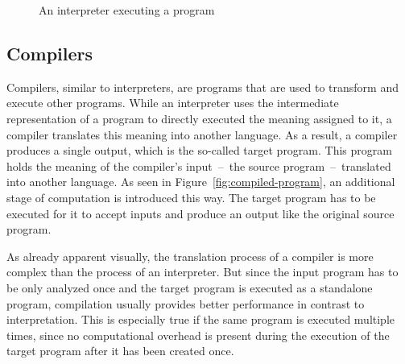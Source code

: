 \begin{figure}[h]
  \centering
  \caption{An interpreter executing a program}\label{fig:interpreted-program}
\end{figure}


\subsection{Compilers}

Compilers, similar to interpreters, are programs that are used to transform and execute other programs.
While an interpreter uses the intermediate representation of a program to directly executed the meaning assigned to it, a compiler translates this meaning into another language.
As a result, a compiler produces a single output, which is the so-called target program.
This program holds the meaning of the compiler's input~--~the source program~--~translated into another language.
As seen in Figure~\ref{fig:compiled-program}, an additional stage of computation is introduced this way.
The target program has to be executed for it to accept inputs and produce an output like the original source program.

As already apparent visually, the translation process of a compiler is more complex than the process of an interpreter.
But since the input program has to be only analyzed once and the target program is executed as a standalone program, compilation usually provides better performance in contrast to interpretation.
This is especially true if the same program is executed multiple times, since no computational overhead is present during the execution of the target program after it has been created once.


